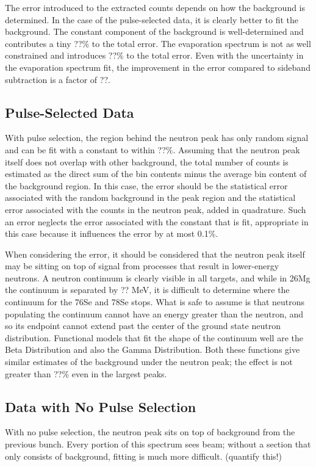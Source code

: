 The error introduced to the extracted counts depends on how the background is determined.  In the case of the pulse-selected data, it is clearly better to fit the background.  The constant component of the background is well-determined and contributes a tiny ??\% to the total error.  The evaporation spectrum is not as well constrained and introduces ??\% to the total error.  Even with the uncertainty in the evaporation spectrum fit, the improvement in the error compared to sideband subtraction is a factor of ??.

\subsection{Pulse-Selected Data}
With pulse selection, the region behind the neutron peak has only random signal and can be fit with a constant to within ??\%.  Assuming that the neutron peak itself does not overlap with other background, the total number of counts is estimated as the direct sum of the bin contents minus the average bin content of the background region.  In this case, the error should be the statistical error associated with the random background in the peak region and the statistical error associated with the counts in the neutron peak, added in quadrature.  Such an error neglects the error associated with the constant that is fit, appropriate in this case because it influences the error by at most 0.1\%.

When considering the error, it should be considered that the neutron peak itself may be sitting on top of signal from processes that result in lower-energy neutrons.  A neutron continuum is clearly visible in all targets, and while in 26Mg the continuum is separated by ?? MeV, it is difficult to determine where the continuum for the 76Se and 78Se stops.  What is safe to assume is that neutrons populating the continuum cannot have an energy greater than the \zp neutron, and so its endpoint cannot extend past the center of the ground state neutron distribution.  Functional models that fit the shape of the continuum well are the Beta Distribution and also the Gamma Distribution.  Both these functions give similar estimates of the background under the neutron peak; the effect is not greater than ??\% even in the largest peaks.

\subsection{Data with No Pulse Selection}
With no pulse selection, the neutron peak sits on top of background from the previous bunch.  Every portion of this spectrum sees beam; without a section that only consists of background, fitting is much more difficult. (quantify this!)

